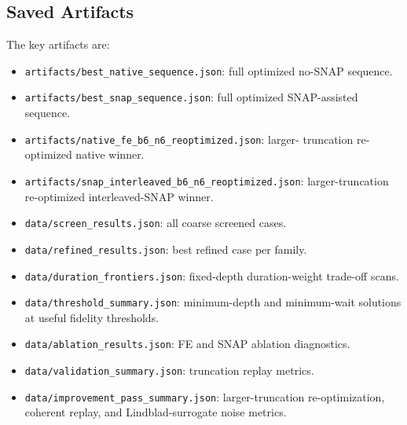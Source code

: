\documentclass[aps,pra,twocolumn,reprint,amsmath,amssymb]{revtex4-2}
\begin{document}
\subsection{Saved Artifacts}
The key artifacts are:
\begin{itemize}
  \item \texttt{artifacts/best\_native\_sequence.json}: full optimized no-SNAP
  sequence.
  \item \texttt{artifacts/best\_snap\_sequence.json}: full optimized
  SNAP-assisted sequence.
  \item \texttt{artifacts/native\_fe\_b6\_n6\_reoptimized.json}: larger-
  truncation re-optimized native winner.
  \item \texttt{artifacts/snap\_interleaved\_b6\_n6\_reoptimized.json}:
  larger-truncation re-optimized interleaved-SNAP winner.
  \item \texttt{data/screen\_results.json}: all coarse screened cases.
  \item \texttt{data/refined\_results.json}: best refined case per family.
  \item \texttt{data/duration\_frontiers.json}: fixed-depth duration-weight
  trade-off scans.
  \item \texttt{data/threshold\_summary.json}: minimum-depth and minimum-wait
  solutions at useful fidelity thresholds.
  \item \texttt{data/ablation\_results.json}: FE and SNAP ablation diagnostics.
  \item \texttt{data/validation\_summary.json}: truncation replay metrics.
  \item \texttt{data/improvement\_pass\_summary.json}: larger-truncation
  re-optimization, coherent replay, and Lindblad-surrogate noise metrics.
\end{itemize}
\end{document}
